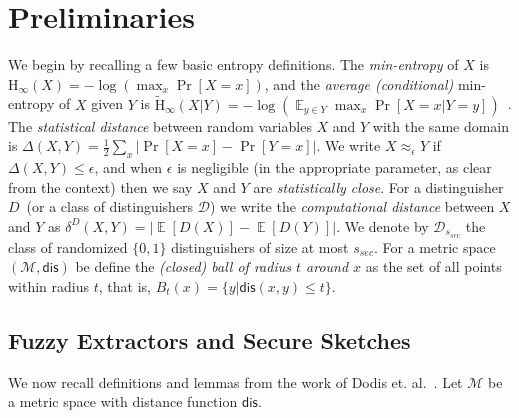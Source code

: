 \documentclass[11pt]{article}
\DeclareMathOperator*{\expe}{\mathbb{E}}
\newcommand{\dis}{\ensuremath{\mathsf{dis}}}
\newcommand{\Hoo}{\mathrm{H}_\infty}
\newcommand{\Hav}{\tilde{\mathrm{H}}_\infty}
\def\col{\mathrm{Col}}
\newcommand{\authnote}[2]{{\textcolor{red}{\textsf{#1 notes: }\textcolor{blue}{ #2}}\marginpar{\textcolor{red}{\textbf{!!!!!}}}}}
\newcommand{\authnote}[2]{}
\newcommand{\lnote}[1]{{\authnote{Leo}{#1}}}
\begin{document}
\section{Preliminaries}
\label{sec:preliminaries}
We begin by recalling a few basic entropy definitions.  The {\em min-entropy} of $X$ is $\Hoo(X) = -\log(\max_x \Pr[X=x])$, 
and the {\em average (conditional)} min-entropy of $X$ given $Y$ is  $\Hav(X|Y) = -\log(\expe_{y\in Y} \max_{x} \Pr[X=x|Y=y])$~\cite{DBLP:journals/siamcomp/DodisORS08}.  
The {\em statistical distance} between random variables $X$ and $Y$ with the same domain is $\Delta(X,Y) = \frac12 \sum_x |\Pr[X=x] - \Pr[Y=x]|$. We write $X \approx_{\epsilon} Y$ if $\Delta(X,Y) \leq \epsilon$, and when $\epsilon$ is negligible (in the appropriate parameter, as clear from the context) then we say $X$ and $Y$ are \emph{statistically close}.  For a distinguisher $D$~(or a class of distinguishers $\mathcal{D}$) we write the \emph{computational distance} between $X$ and $Y$ as $\delta^D(X,Y) = \left| \expe[D(X)]-\expe[D(Y)]\right |$.  We denote by $\mathcal{D}_{s_{sec}}$ the class of randomized $\{0,1\}$ distinguishers of size at most $s_{sec}$.
For a metric space $(\mathcal{M}, \dis)$ be define the \emph{(closed) ball of radius $t$ around $x$} as the  set of all points within radius $t$, that is, $B_t(x) = \{y| \dis(x, y)\leq t\}$.

\subsection{Fuzzy Extractors and Secure Sketches}
\label{sec:fuzzy extractors}

We now recall definitions and lemmas from the work of Dodis et. al.~\cite[Sections 2.5--4.1, 8]{DBLP:journals/siamcomp/DodisORS08}.  Let $\mathcal{M}$ be a metric space with distance function $\dis$.%
\end{document}

